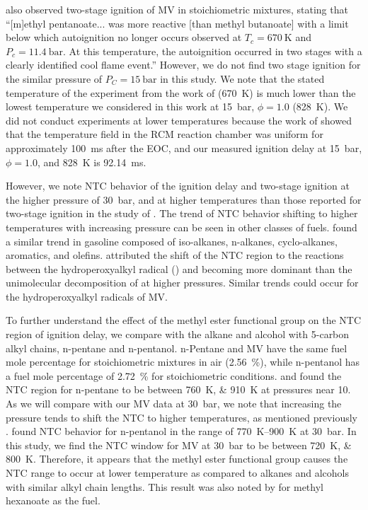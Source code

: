 \documentclass[letterpaper, review, sort&compress]{elsarticle}
\begin{document}
\citet{Hadj-Ali2009} also observed two-stage ignition of MV in stoichiometric mixtures, stating that
``[m]ethyl pentanoate... was more reactive [than methyl butanoate] with a limit below which
autoignition no longer occurs observed at \(T_c = \SI{670}{\K}\) and \(P_c = \SI{11.4}{\bar}\). At
this temperature, the autoignition occurred in two stages with a clearly identified cool flame
event.'' However, we do not find two stage ignition for the similar pressure of
\(P_C = \SI{15}{\bar}\) in this study. We note that the stated temperature of the experiment from
the work of \citet{Hadj-Ali2009} (\SI{670}{\K}) is much lower than the lowest temperature we
considered in this work at \SI{15}{\bar}, \(\phi=1.0\) (\SI{828}{\K}). We did not conduct
experiments at lower temperatures because the work of \citet{Mittal2006} showed that the temperature
field in the RCM reaction chamber was uniform for approximately \SI{100}{\ms} after the EOC, and our
measured ignition delay at \SI{15}{\bar}, \(\phi=1.0\), and \SI{828}{\K} is \SI{92.14}{\ms}.

However, we note NTC behavior of the ignition delay and two-stage ignition at the higher pressure of
\SI{30}{\bar}, and at higher temperatures than those reported for two-stage ignition in the study of
\citet{Hadj-Ali2009}. The trend of NTC behavior shifting to higher temperatures with increasing
pressure can be seen in other classes of fuels. \citet{Kukkadapu2012} found a similar trend in
gasoline composed of iso-alkanes, n-alkanes, cyclo-alkanes, aromatics, and olefins.
\citet{Kukkadapu2012} attributed the shift of the NTC region to the reactions between the
hydroperoxyalkyl radical () and  becoming more dominant than the unimolecular
decomposition of  at higher pressures. Similar trends could occur for the hydroperoxyalkyl
radicals of MV.

To further understand the effect of the methyl ester functional group on the NTC region of ignition
delay, we compare with the alkane and alcohol with 5-carbon alkyl chains, n-pentane and n-pentanol.
n-Pentane and MV have the same fuel mole percentage for stoichiometric mixtures in air
(\SI{2.56}{\percent}), while n-pentanol has a fuel mole percentage of \SI{2.72}{\percent} for
stoichiometric conditions. \citet{Ribaucour1998} and \citet{Bugler2015} found the NTC region for
n-pentane to be between \SIlist{760;910}{\K} at pressures near \SI{10}{\atm}. As we will compare
with our MV data at \SI{30}{\bar}, we note that increasing the pressure tends to shift the NTC to
higher temperatures, as mentioned previously \cite{Kukkadapu2012}. \citet{Heufer2013} found NTC
behavior for n-pentanol in the range of \SIrange{770}{900}{\K} at \SI{30}{\bar}. In this study, we
find the NTC window for MV at \SI{30}{\bar} to be between \SIlist{720;800}{\K}. Therefore, it
appears that the methyl ester functional group causes the NTC range to occur at lower temperature as
compared to alkanes and alcohols with similar alkyl chain lengths. This result was also noted by
\citet{Hadj-Ali2009} for methyl hexanoate as the fuel.
\end{document}
